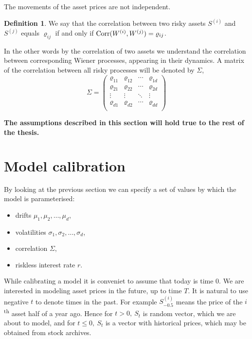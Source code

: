 \documentclass[a4paper,11pt, twoside]{book}
\theoremstyle{definition}
\newtheorem{mydef}{Definition}[chapter]
\theoremstyle{remark}
\def\Corr{{\hbox{Corr}}}
\begin{document}
The movements of the asset prices are not independent.
\begin{mydef}
 We say that the correlation between two risky assets $S^{(i)}$ and $S^{(j)}$ equals $\varrho_{ij}$ if and only if $\Corr(W^{(i)}, W^{(j)}) = \varrho_{ij}$.
\end{mydef}
In the other words by the correlation of two assets we understand the correlation between corresponding Wiener processes, appearing in their dynamics. A matrix of the correlation between all risky processes will be denoted by $\Sigma$,
\begin{equation*}
 \Sigma = \left( \begin{array}{cccc}
           \varrho_{11} & \varrho_{12} & \cdots & \varrho_{1d} \\
           \varrho_{21} & \varrho_{22} & \cdots & \varrho_{2d} \\
           \vdots & \vdots & \ddots & \vdots \\
           \varrho_{d1} & \varrho_{d2} & \cdots & \varrho_{dd} \\
          \end{array} \right)
\end{equation*}

\textbf{The assumptions described in this section will hold true to the rest of the thesis.}

\section{Model calibration}
By looking at the previous section we can specify a set of values by which the model is parameterised:
\begin{itemize}
 \item drifts $\mu_1, \mu_2, \ldots, \mu_d$,
 \item volatilities $\sigma_1, \sigma_2, \ldots, \sigma_d$,
 \item correlation $\Sigma$,
 \item riskless interest rate $r$.
\end{itemize}
While calibrating a model it is conveniet to assume that today is time $0$. We are interested in modeling asset prices in the future, up to time $T$. It is natural to use negative $t$ to denote times in the past. For example $S^{(i)}_{-0.5}$ means the price of the $i$\textsuperscript{th} asset half of a year ago. Hence for $t > 0,\ S_t$ is random vector, which we are about to model, and for $t \leq 0,\ S_t$ is a vector with historical prices, which may be obtained from stock archives.
\end{document}
